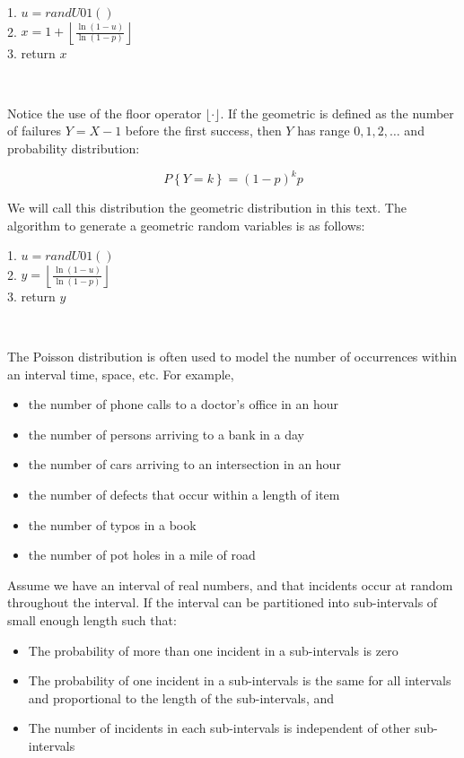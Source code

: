 \documentclass[
]{book}
\theoremstyle{definition}
\theoremstyle{definition}
\theoremstyle{definition}
\theoremstyle{definition}
\theoremstyle{remark}
\begin{document}
1. \(u = randU01()\)\\
2. \(x = 1 + \left\lfloor \frac{\ln(1-u)}{\ln(1-p)}\right\rfloor\)\\
3. return \(x\)

~

Notice the use of the floor operator \(\lfloor \cdot \rfloor\). If the geometric is defined as the number of failures \(Y = X -1\) before
the first success, then \(Y\) has range \(0, 1, 2, \ldots\) and probability
distribution:

\[P\left\{Y=k\right\} = (1-p)^{k}p\]

We will call this distribution the geometric distribution in this text.
The algorithm to generate a geometric random variables is as follows:

1. \(u = randU01()\)\\
2. \(y = \left\lfloor \frac{\ln(1-u)}{\ln(1-p)}\right\rfloor\)\\
3. return \(y\)

~

The Poisson distribution is often used to model the number of
occurrences within an interval time, space, etc. For example,

\begin{itemize}
\item
  the number of phone calls to a doctor's office in an hour
\item
  the number of persons arriving to a bank in a day
\item
  the number of cars arriving to an intersection in an hour
\item
  the number of defects that occur within a length of item
\item
  the number of typos in a book
\item
  the number of pot holes in a mile of road
\end{itemize}

Assume we have an interval of real numbers, and that incidents occur at
random throughout the interval. If the interval can be partitioned into
sub-intervals of small enough length such that:

\begin{itemize}
\item
  The probability of more than one incident in a sub-intervals is zero
\item
  The probability of one incident in a sub-intervals is the same for
  all intervals and proportional to the length of the sub-intervals,
  and
\item
  The number of incidents in each sub-intervals is independent of
  other sub-intervals
\end{itemize}
\end{document}
